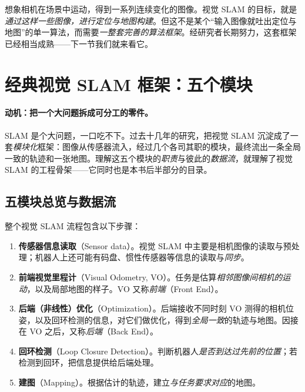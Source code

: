 \noindent 想象相机在场景中运动，得到一系列连续变化的图像。视觉 SLAM 的目标，就是\emph{通过这样一些图像，进行定位与地图构建}\cite{gaoxiang2019slam14}。但这不是某个“输入图像就吐出定位与地图”的单一算法，而需要\emph{一整套完善的算法框架}。经研究者长期努力，这套框架已经相当成熟——下一节我们就来看它。

\section{经典视觉 SLAM 框架：五个模块}
\label{sec:intro-frame}

\paragraph{动机：把一个大问题拆成可分工的零件。}
SLAM 是个大问题，一口吃不下。过去十几年的研究，把视觉 SLAM 沉淀成了一套\emph{模块化}框架\cite{gaoxiang2019slam14}：图像从传感器流入，经过几个各司其职的模块，最终流出一条全局一致的轨迹和一张地图。理解这五个模块的\emph{职责}与彼此的\emph{数据流}，就理解了视觉 SLAM 的工程骨架——它同时也是本书后半部分的目录。

\subsection{五模块总览与数据流}
\label{sec:intro-pipeline}
整个视觉 SLAM 流程包含以下步骤\cite{gaoxiang2019slam14}：

\begin{enumerate}
  \item \textbf{传感器信息读取}（Sensor data）。视觉 SLAM 中主要是相机图像的读取与预处理；机器人上还可能有码盘、惯性传感器等信息的读取与\emph{同步}。
  \item \textbf{前端视觉里程计}（Visual Odometry, VO）。任务是估算\emph{相邻图像间相机的运动}，以及局部地图的样子。VO 又称\emph{前端}（Front End）。
  \item \textbf{后端（非线性）优化}（Optimization）。后端接收不同时刻 VO 测得的相机位姿，以及回环检测的信息，对它们做优化，得到\emph{全局一致}的轨迹与地图。因接在 VO 之后，又称\emph{后端}（Back End）。
  \item \textbf{回环检测}（Loop Closure Detection）。判断机器人\emph{是否到达过先前的位置}；若检测到回环，把信息提供给后端处理。
  \item \textbf{建图}（Mapping）。根据估计的轨迹，建立\emph{与任务要求对应}的地图。
\end{enumerate}

